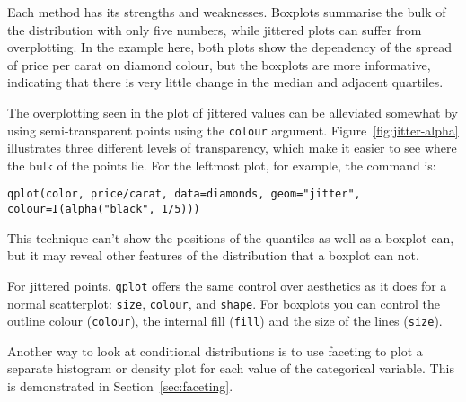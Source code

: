 Each method has its strengths and weaknesses.  Boxplots summarise the bulk of the distribution with only five numbers, while jittered plots can suffer from overplotting.  In the example here, both plots show the dependency of the spread of price per carat on diamond colour, but the boxplots are more informative, indicating that there is very little change in the median and adjacent quartiles.

The overplotting seen in the plot of jittered values can be alleviated somewhat by using semi-transparent points using the {\tt colour} argument. Figure~\ref{fig:jitter-alpha} illustrates three different levels of transparency, which make it easier to see where the bulk of the points lie.  For the leftmost plot, for example, the command is:

{\tt qplot(color, price/carat, data=diamonds, geom="jitter",
    colour=I(alpha("black", 1/5)))}

This technique can't show the positions of the quantiles as well as a boxplot can, but it may reveal other features of the distribution that a boxplot can not.

% 


% 
For jittered points, {\tt qplot} offers the same control over aesthetics as it does for  a normal scatterplot: {\tt size}, {\tt colour}, and {\tt shape}.  For boxplots you can control the outline colour ({\tt colour}), the internal fill ({\tt fill}) and the size of the lines ({\tt size}).

Another way to look at conditional distributions is to use faceting to plot a separate histogram or density plot for each value of the categorical variable.  This is demonstrated in Section~\ref{sec:faceting}.

